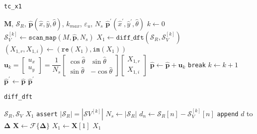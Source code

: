 \begin{algorithm}
  \caption{\texttt{tc\_x1}}
  \begin{spacing}{1.3}
    \begin{algorithmic}[1]
      \REQUIRE $\bm{M}$, $\mathcal{S}_R$, $\hat{\bm{p}}(\hat{x}, \hat{y}, \hat{\theta})$, $k_{max}$, $\varepsilon_u$, $N_s$
      \ENSURE $\hat{\bm{p}}^\prime(\hat{x}^{\prime}, \hat{y}^{\prime}, \hat{\theta})$
      \STATE $k \leftarrow 0$
      \STATE $\mathcal{S}_V^{[k]} \leftarrow \texttt{scan\_map}(M, \hat{\bm{p}}, N_s)$
      \STATE $X_1 \leftarrow \texttt{diff\_dft}(\mathcal{S}_R, \mathcal{S}_V^{[k]})$
      \STATE $(X_{1,r}, X_{1,i}) \leftarrow (\texttt{re}(X_1), \texttt{im}(X_1))$
      \STATE $\bm{u}_k = \begin{bmatrix}
              u_x \\ u_y
             \end{bmatrix}
             =
             \dfrac{1}{N_s}
             \begin{bmatrix}
               \cos\hat{\theta} & \sin\hat{\theta} \\
               \sin\hat{\theta} & -\cos\hat{\theta}
             \end{bmatrix}
             \begin{bmatrix}
               X_{1,r} \\ X_{1,i}
             \end{bmatrix}
             $
      \STATE $\hat{\bm{p}}\leftarrow \hat{\bm{p}}+ \bm{u}_k$
        \STATE \texttt{break}
      \ENDIF
      \STATE $k \leftarrow k + 1$
      \ENDWHILE
      \STATE $\hat{\bm{p}}^\prime \leftarrow \hat{\bm{p}}$
      \RETURN $\hat{\bm{p}}^\prime$
    \end{algorithmic}
  \end{spacing}
  \label{alg:icte}
\end{algorithm}

\begin{algorithm}
  \caption{\texttt{diff\_dft}}
  \begin{spacing}{1.3}
    \begin{algorithmic}[1]
      \REQUIRE $\mathcal{S}_R, \mathcal{S}_V$
      \ENSURE $X_1$
      \STATE \texttt{assert} $|\mathcal{S}_R| = |\mathcal{S}V^{[k]}|$
      \STATE $N_s \leftarrow |\mathcal{S}_R|$
      \STATE {$\bm{\Delta} \leftarrow \{\varnothing\}$}
      \STATE $d_n \leftarrow \mathcal{S}_R[n] - \mathcal{S}_V^{[k]}[n]$
      \STATE \texttt{append} $d$ to $\bm{\Delta}$
      \ENDFOR
      \STATE $\bm{X} \leftarrow \mathcal{F}\{\bm{\Delta}\}$
      \STATE $X_1 \leftarrow \bm{X}[1]$
      \RETURN $X_1$
    \end{algorithmic}
  \end{spacing}
  \label{alg:diff_dft}
\end{algorithm}
